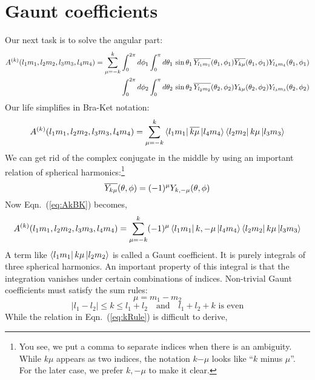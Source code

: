 \section{Gaunt coefficients}
Our next task is to solve the angular part:
\begin{align} \label{eq:Ak}
A^{(k)}(l_1m_1,l_2m_2,l_3m_3,l_4m_4) = \sum_{\mu=-k}^k
& \int_0^{2\pi}d\phi_1 \int_0^{\pi}d\theta_1\,\sin{\theta_1}\,
  \overline{Y_{l_1m_1}}(\theta_1,\phi_1) \overline{Y_{k\mu}}(\theta_1,\phi_1) Y_{l_4m_4}(\theta_1,\phi_1) \nonumber \\
& \int_0^{2\pi}d\phi_2 \int_0^{\pi}d\theta_2\,\sin{\theta_2}\,
  \overline{Y_{l_2m_2}}(\theta_2,\phi_2) Y_{k\mu}(\theta_2,\phi_2) Y_{l_3m_3}(\theta_2,\phi_2)
\end{align}
%
Our life simplifies in Bra-Ket notation:
\begin{equation} \label{eq:AkBK}
A^{(k)}(l_1m_1,l_2m_2,l_3m_3,l_4m_4) = \sum_{\mu=-k}^k \Bra{l_1m_1} \overline{k\mu} \Ket{l_4m_4} \Bra{l_2m_2} k\mu \Ket{l_3m_3}
\end{equation}
%
We can get rid of the complex conjugate in the middle by using an important relation
of spherical harmonics:\footnote{You see, we put a comma to
separate indices when there is an ambiguity. While $k\mu$ appears as two indices,
the notation $k{-\mu}$ looks like ``$k$ minus $\mu$''. For the later case, we prefer $k,-\mu$
to make it clear.}
\begin{equation} \label{eq:YY}
\overline{Y_{k\mu}}(\theta,\phi) = (-1)^{\mu} Y_{k,-\mu}(\theta,\phi)
\end{equation}
%
Now Eqn.~(\ref{eq:AkBK}) becomes,
\begin{equation} \label{eq:AkBKm}
A^{(k)}(l_1m_1,l_2m_2,l_3m_3,l_4m_4) = \sum_{\mu=-k}^k (-1)^{\mu} \Bra{l_1m_1} k,-\mu \Ket{l_4m_4} \Bra{l_2m_2} k\mu \Ket{l_3m_3}
\end{equation}
%
A term like $\Bra{l_1m_1} k\mu \Ket{l_2m_2}$ is called a Gaunt coefficient.
It is purely integrals of three spherical harmonics. An important property of
this integral is that the integration vanishes under certain combinations of
indices. Non-trivial Gaunt coefficients must satisfy the sum rules:
\begin{equation} \label{eq:muRule}
\mu = m_1 - m_2
\end{equation}
\begin{equation} \label{eq:kRule}
|l_1-l_2| \le k \le l_1+l_2 \quad \text{and} \quad l_1+l_2+k \text{ is even}
\end{equation}
%
While the relation in Eqn.~(\ref{eq:kRule}) is difficult to derive,
